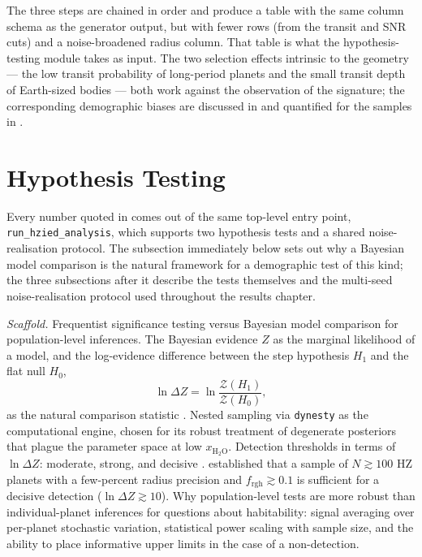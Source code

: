The three steps are chained in order and produce a table with the
same column schema as the generator output, but with fewer rows
(from the transit and SNR cuts) and a noise-broadened radius column.
That table is what the hypothesis-testing module takes as input.
The two selection effects intrinsic to the geometry --- the low
transit probability of long-period planets and the small transit
depth of Earth-sized bodies --- both work against the observation of
the \HZIED signature; the corresponding demographic biases are
discussed in  and quantified for the
\PLATO samples in .


\section{Hypothesis Testing}
\label{sec:inference_methodology}

Every number quoted in  comes out of the same
top-level entry point, \texttt{run\_hzied\_analysis}, which supports
two hypothesis tests and a shared noise-realisation protocol.  The
subsection immediately below sets out why a Bayesian model
comparison is the natural framework for a demographic test of this
kind; the three subsections after it describe the tests themselves
and the multi-seed noise-realisation protocol used throughout the
results chapter.

\label{ssec:why_bayesian}

\emph{Scaffold.}
Frequentist significance testing versus Bayesian model comparison for
population-level inferences.  The Bayesian evidence $Z$ as the
marginal likelihood of a model, and the log-evidence difference
between the step hypothesis $H_1$ and the flat null $H_0$,
%
\begin{equation}
    \ln\Delta Z = \ln \frac{\mathcal{Z}(H_1)}{\mathcal{Z}(H_0)},
    \label{eq:lnDZ}
\end{equation}
%
as the natural comparison statistic \parencite{Skilling2004}.  Nested
sampling via \texttt{dynesty} \parencite{Speagle2020} as the
computational engine, chosen for its robust treatment of degenerate
posteriors that plague the \HZIED parameter space at low
$x_{\mathrm{H_2O}}$.  Detection thresholds in terms of $\ln\Delta Z$:
moderate, strong, and decisive \parencite{Trotta2008}.
\textcite{Schlecker2024} established that a sample of
$N \gtrsim 100$ HZ planets with a few-percent radius precision and
$f_\mathrm{rgh} \gtrsim 0.1$ is sufficient for a decisive detection
($\ln\Delta Z \gtrsim 10$).  Why population-level tests are more
robust than individual-planet inferences for questions about
habitability: signal averaging over per-planet stochastic variation,
statistical power scaling with sample size, and the ability to place
informative upper limits in the case of a non-detection.


